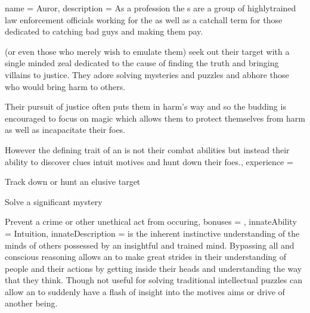 \archetype
{
	name = Auror,
	description = As a profession\comma{} the \auror{}s are a group of highly\minus{}trained law enforcement officials working for the \comma{} as well as a catchall term for those dedicated to catching bad guys and making them pay.

 (or even those who merely wish to emulate them) seek out their target with a single minded zeal\comma{} dedicated to the cause of finding the truth and bringing villains to justice. They adore solving mysteries and puzzles\comma{} and abhore those who would bring harm to others. 

Their pursuit of justice often puts them in harm's way\comma{} and so the budding \auror{} is encouraged to focus on magic which allows them to protect themselves from harm\comma{} as well as incapacitate their foes. 

However\comma{} the defining trait of an \auror{} is not their combat abilities but instead their ability to discover clues\comma{} intuit motives and hunt down their foes.,
	experience = \item Track down or hunt an elusive target
\item Solve a significant mystery 
\item Prevent a crime or other unethical act from occuring,
	bonuses = 
,
	innateAbility = Intuition,
	innateDescription = \imp{\innateAbility} is the inherent\comma{} instinctive understanding of the minds of others possessed by an insightful and trained mind. Bypassing all  and conscious reasoning\comma{}  allows an \name{} to make great strides in their understanding of people and their actions by getting inside their heads and understanding the way that they think. Though not useful for solving traditional intellectual puzzles\comma{} \imp{\innateAbility} can allow an \bname{} to suddenly have a flash of insight into the motives\comma{} aims or drive of another being. 

}
